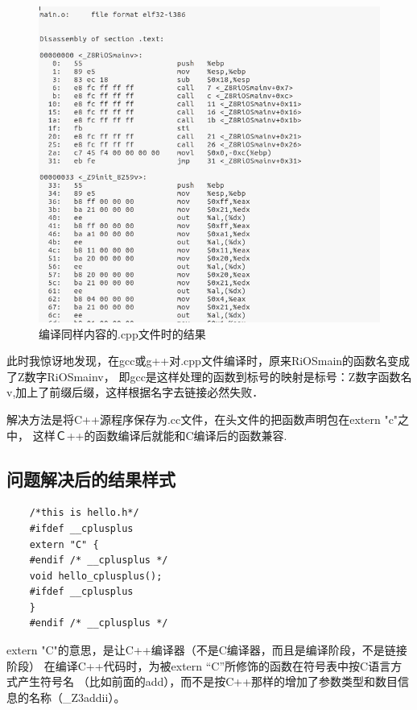 \begin{figure}[!htbp]
    \centering	\includegraphics[width=14cm]{pic/assets/problems/problem01_3}
    \caption{编译同样内容的.cpp文件时的结果}	\label{problem01_3}	\end{figure}

此时我惊讶地发现，在gcc或g++对.cpp文件编译时，原来RiOSmain的函数名变成了Z数字RiOSmainv，
即gcc是这样处理的函数到标号的映射是标号：Z数字函数名v,加上了前缀后缀，这样根据名字去链接必然失败．

解决方法是将C++源程序保存为.cc文件，在头文件的把函数声明包在extern "c"{}之中，
这样Ｃ++的函数编译后就能和C编译后的函数兼容.
        
\subsection{问题解决后的结果样式}

\begin{verbatim}
    /*this is hello.h*/
    #ifdef __cplusplus
    extern "C" {
    #endif /* __cplusplus */
    void hello_cplusplus();
    #ifdef __cplusplus
    }
    #endif /* __cplusplus */    
\end{verbatim}
extern "C"的意思，是让C++编译器（不是C编译器，而且是编译阶段，不是链接阶段）
在编译C++代码时，为被extern “C”所修饰的函数在符号表中按C语言方式产生符号名
（比如前面的add），而不是按C++那样的增加了参数类型和数目信息的名称（\_Z3addii）。


